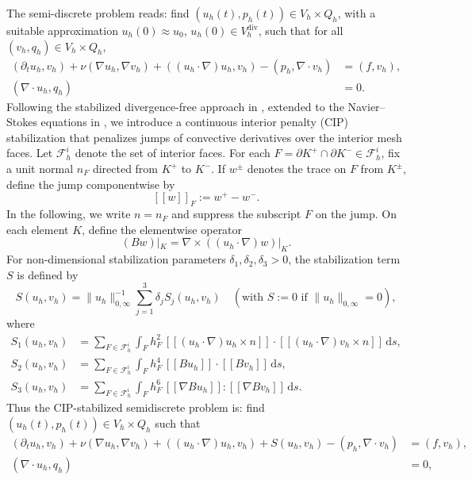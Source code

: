 \documentclass[11pt]{article}
\theoremstyle{remark}\newtheorem{remark}{Remark}
\newcommand{\dd}{\mathrm{d}}
\newcommand{\Vh}{V_h}\newcommand{\Qh}{Q_h}
\newcommand{\Vdivh}{V_h^{\mathrm{div}}}
\theoremstyle{plain}
\begin{document}
The semi-discrete problem reads: find $(u_h(t),p_h(t))\in\Vh\times\Qh$, with a suitable approximation $u_h(0)\approx u_0$, $u_h(0)\in\Vdivh$, such that for all $(v_h,q_h)\in\Vh\times\Qh$,
\begin{equation}\label{eq:sdp}
\begin{aligned}
(\partial_tu_h,v_h)+\nu(\nabla u_h,\nabla v_h)+((u_h\cdot\nabla)u_h,v_h)-(p_h,\nabla\cdot v_h)&=(f,v_h),\\
(\nabla\cdot u_h,q_h)&=0.
\end{aligned}
\end{equation}
Following the stabilized divergence-free approach in \cite{BBCG24}, extended to the Navier--Stokes equations in \cite{GAN25}, we introduce a continuous interior penalty (CIP) stabilization that penalizes jumps of convective derivatives over the interior mesh faces. Let $\mathcal F_h^i$ denote the set of interior faces. For each $F=\partial K^+\cap\partial K^-\in\mathcal F_h^i$, fix a unit normal $n_F$ directed from $K^+$ to $K^-$. If $w^\pm$ denotes the trace on $F$ from $K^\pm$, define the jump componentwise by
\[
[\![w]\!]_F:=w^+-w^-.
\]
In the following, we write $n=n_F$ and suppress the subscript $F$ on the jump. %
On each element $K$, define the elementwise operator
\[(Bw)|_K=\nabla\times((u_h\cdot\nabla)w)|_K.\]
For non-dimensional stabilization parameters $\delta_1,\delta_2,\delta_3>0$, the stabilization term $S$ is defined by
\[S(u_h,v_h)=\|u_h\|_{0,\infty}^{-1}\sum_{j=1}^3\delta_jS_j(u_h,v_h)\quad(\text{with }S:=0\text{ if }\|u_h\|_{0,\infty}=0),\]
where
\begin{align*}
S_1(u_h,v_h)&=\sum_{F\in\mathcal F_h^i}\int_F h_F^2\,[\![(u_h\cdot\nabla)u_h\times n]\!]\cdot[\![(u_h\cdot\nabla)v_h\times n]\!]\,\dd s,\\
S_2(u_h,v_h)&=\sum_{F\in\mathcal F_h^i}\int_F h_F^4\,[\![Bu_h]\!]\cdot[\![Bv_h]\!]\,\dd s,\\
S_3(u_h,v_h)&=\sum_{F\in\mathcal F_h^i}\int_F h_F^6\,[\![\nabla Bu_h]\!]:[\![\nabla Bv_h]\!]\,\dd s.
\end{align*}
Thus the CIP-stabilized semidiscrete problem is: find $(u_h(t),p_h(t))\in\Vh\times\Qh$ such that
\begin{equation}\label{eq:sdp-stab}
\begin{aligned}
(\partial_tu_h,v_h)+\nu(\nabla u_h,\nabla v_h)+((u_h\cdot\nabla)u_h,v_h)+S(u_h,v_h)-(p_h,\nabla\cdot v_h)&=(f,v_h),\\
(\nabla\cdot u_h,q_h)&=0,
\end{aligned}
\end{equation}
\end{document}
